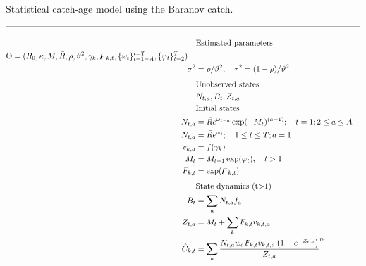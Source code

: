 \begin{tablehere}
  \centering
\caption{Statistical catch-age model using the Baranov catch.}
\label{tab:statistical_catch_age_model}
\tableEq
    \begin{align}
        \hline \nonumber \\
        &\mbox{Estimated parameters} \nonumber\\
        \begin{split}
        \Theta&= 
                (R_0,\kappa,M,\bar{R},\rho,\vartheta^2,\gamma_{k},%
                \digamma_{k,t},
                \{\omega_t\}_{t=1-A}^{t=T},
                \{\varphi_t \}_{t=2}^T)
    \end{split} \label{T4.1}\\
        \sigma^2&=\rho /\vartheta^2, \quad
        \tau^2=(1-\rho)/\vartheta^2\label{T4.2}\\[1ex]
        &\mbox{Unobserved states} \nonumber\\
        &N_{t,a},B_t,Z_{t,a}    \label{T4.3}\\
        &\mbox{Initial states} \nonumber\\
        N_{t,a}&=\bar{R}e^{\omega_{t-a}} \exp(-M_t)^{(a-1)};\quad t=1;  2\leq a\leq A \label{T4.4}\\
        N_{t,a}&=\bar{R}e^{\omega_{t}} ;\quad 1\leq t\leq T;  a=1 \label{T4.5}\\
        v_{k,a}&=f(\gamma_k) \label{T4.6}\\
        M_t &= M_{t-1} \exp(\varphi_t), \quad t>1 \label{T4.6b}\\
        F_{k,t}&=\exp(\digamma_{k,t}) \label{T4.7}\\[1ex]
        &\mbox{State dynamics (t$>$1)} \nonumber\\
        B_t&=\sum_a N_{t,a}f_a \label{T4.8}\\
        Z_{t,a}&=M_t+\sum_k F_{k,t} v_{k,t,a}\label{T4.9}\\
        \hat{C}_{k,t}&=\sum _ a\frac {N_{{t,a}}w_{{a}}F_{k,t} v_{{k,t,a}}
        \left( 1-{e^{-Z_{t,a}}} \right) }{Z_{t,a}}^{\eta_t} \label{T4.10}\\

\end{align}
\end{tablehere}
